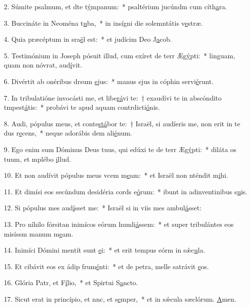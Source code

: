 2. Súmite psalmum, et dte t\uline{ý}mpanum:~* psaltérium jucúndm cum cíth\uline{a}ra.\par 
3. Buccináte in Neoména t\uline{u}ba,~* in insígni die solemntátis v\uline{e}stræ.\par 
4. Quia præcéptum in sra\uline{ë}l est:~* et judícim Deo J\uline{a}cob.\par 
5. Testimónium in Joseph pósuit illud, cum exíret de terr Æg\uline{ý}pti:~* linguam, quam non nóvrat, aud\uline{í}vit.\par 
6. Divértit ab onéribus drsum \uline{e}jus:~* manus ejus in cóphin servi\uline{é}runt.\par 
7. In tribulatióne invocásti me, et libe\uline{rá}vi te:~† exaudívi te in abscóndito tmpest\uline{á}tis:~* probávi te apud aquam contrdicti\uline{ó}nis.\par 
8. Audi, pópulus meus, et conte\uline{stá}bor te:~† Israël, si audíeris me, non erit in te dus r\uline{e}cens,~* neque adorábis dem ali\uline{é}num.\par 
9. Ego enim sum Dóminus Deus tuus, qui edúxi te de terr Æg\uline{ý}pti:~* diláta os tuum, et mplébo \uline{i}llud.\par 
10. Et non audívit pópulus meus vcem m\uline{e}am:~* et Israël non nténdit m\uline{i}hi.\par 
11. Et dimísi eos secúndum desidéria cords e\uline{ó}rum:~* ibunt in adinventinibus s\uline{u}is.\par 
12. Si pópulus mes aud\uline{í}sset me:~* Israël si in viis mes ambul\uline{á}sset:\par 
13. Pro níhilo fórsitan inimícos eórum humli\uline{á}ssem:~* et super tribulántes eos misíssm manum m\uline{e}am.\par 
14. Inimíci Dómini mentít sunt \uline{e}i:~* et erit tempus eórm in sǽc\uline{u}la.\par 
15. Et cibávit eos ex ádip frum\uline{é}nti:~* et de petra, melle satrávit \uline{e}os.\par 
16. Glória Patr, et F\uline{í}lio,~* et Spirtui S\uline{a}ncto.\par 
17. Sicut erat in princípio, et nnc, et s\uline{e}mper,~* et in sǽcula sæclórum. \uline{A}men.\par 
